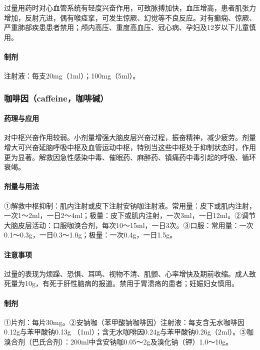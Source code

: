 过量用药时对心血管系统有轻度兴奋作用，可致脉搏加快，血压增高，患者肌张力增加，反射亢进，偶有喉痉挛，可发生惊厥、幻觉等不良反应。对有癫痫、惊厥、严重肺部疾患患者禁用；颅内高压、重度高血压、冠心病、孕妇及12岁以下儿童慎用。

\paragraph{制剂}

注射液：每支20mg（1ml）；100mg（5ml）。

\subsubsection{咖啡因（caffeine，咖啡碱）}

\paragraph{药理与应用}

对中枢兴奋作用较弱。小剂量增强大脑皮层兴奋过程，振奋精神，减少疲劳。剂量增大可兴奋延脑呼吸中枢及血管运动中枢，特别当这些中枢处于抑制状态时，作用更为显著。解救因急性感染中毒、催眠药、麻醉药、镇痛药中毒引起的呼吸、循环衰竭。

\paragraph{剂量与用法}

①解救中枢抑制：肌内注射或皮下注射安钠咖注射液。常用量：皮下或肌内注射，一次1～2ml，一日2～4ml；极量：皮下或肌内注射，一次3ml，一日12ml。②调节大脑皮层活动：口服咖溴合剂，每次10～15ml，一日3次。③口服：常用量：一次0.1～0.3g，一日0.3～1.0g；极量：一次0.4g，一日1.5g。

\paragraph{注意事项}

过量的表现为烦躁、恐惧、耳鸣、视物不清、肌颤、心率增快及期前收缩。成人致死量为10g，有死于肝性脑病的报道。禁用于胃溃疡的患者；妊娠妇女慎用。

\paragraph{制剂}

①片剂：每片30mg。②安钠咖（苯甲酸钠咖啡因）注射液：每支含无水咖啡因0.12g与苯甲酸钠0.13g
（1ml）；含无水咖啡因0.24g与苯甲酸钠0.26g（2ml）。③咖溴合剂（巴氏合剂）：200ml中含安钠咖0.05～2g及溴化钠（钾）1.0～10g。

